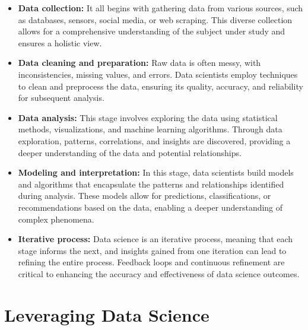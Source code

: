 \documentclass{vgtc}                          %
\begin{document}
\begin{itemize}
    \item \textbf{Data collection:} It all begins with gathering data from various sources, such as databases, sensors, social media, or web scraping. This diverse collection 
    allows for a comprehensive understanding of the subject under study and ensures a holistic view.
    \item \textbf{Data cleaning and preparation:} Raw data is often messy, with inconsistencies, missing values, and errors. Data scientists employ techniques to clean 
    and preprocess the data, ensuring its quality, accuracy, and reliability for subsequent analysis.
    \item \textbf{Data analysis:} This stage involves exploring the data using statistical methods, visualizations, and machine learning algorithms. Through data exploration, 
    patterns, correlations, and insights are discovered, providing a deeper understanding of the data and potential relationships.
    \item \textbf{Modeling and interpretation:} In this stage, data scientists build models and algorithms that encapsulate the patterns and relationships identified during 
    analysis. These models allow for predictions, classifications, or recommendations based on the data, enabling a deeper understanding of complex phenomena.
    \item \textbf{Iterative process:} Data science is an iterative process, meaning that each stage informs the next, and insights gained from one iteration can lead to refining 
    the entire process. Feedback loops and continuous refinement are critical to enhancing the accuracy and effectiveness of data science outcomes.
\end{itemize} 

\section{Leveraging Data Science}
\end{document}
